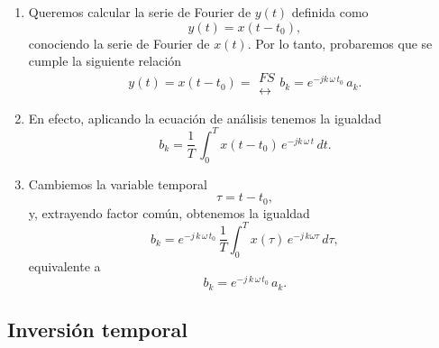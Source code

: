 \begin{enumerate}

\item Queremos calcular la serie de Fourier de $y(t)$ definida como
\begin{equation}
y\left( t\right) =x\left( t-t_{0}\right),
\end{equation}
conociendo la serie de Fourier de $x(t)$. Por lo tanto, probaremos que
se cumple la siguiente relaci\'{o}n
\begin{equation}
y\left( t\right) = x(t - t_{0}) = 
\begin{array}{l}
FS \\ 
\longleftrightarrow
\end{array}
b_{k}=e^{-jk \, \omega \, t_{0}} \, a_{k}.
\end{equation}

\item En efecto, aplicando la ecuaci\'{o}n de an\'{a}lisis tenemos la igualdad
\begin{equation}
b_{k}= \frac{1}{T} \, \int_{0}^{T}x\left( t-t_{0}\right) \,
e^{-jk \, \omega \, t} \, dt.
\end{equation}

\item Cambiemos la variable temporal
\begin{equation}
\tau =t-t_{0},
\end{equation}
y, extrayendo factor com\'{u}n, obtenemos la igualdad
\begin{equation}
b_{k} =e^{-j \, k \, \omega \, t_{0}} \, \frac{1}{T}\int_{0}^{T}x\left(
  \tau\right) \, e^{-j \, k \omega \tau } \, d\tau,
\end{equation}
equivalente a
\begin{equation}
b_{k} = e^{-j \, k \, \omega \, t_{0}} \, a_{k}.
\end{equation}
\end{enumerate}

\subsection{Inversi\'{o}n temporal}

